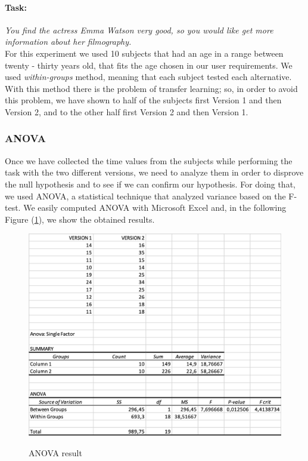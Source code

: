 \documentclass[12pt, a4paper]{article}
\numberwithin{figure}{section}
\begin{document}
\paragraph{Task:} \textit{You find the actress Emma Watson very good, so you would like
get more information about her filmography.}\\ 

\noindent 
For this experiment we used 10 subjects that had an age in a range between twenty - thirty years old, that 
fits the age chosen in our user requirements.
We used \textit{within-groups} method, meaning that each subject tested each alternative.
With this method there is the problem of transfer learning; so, in order to avoid this problem, 
we have shown to half of the subjects first Version 1 and then Version 2, and to the other 
half first Version 2 and then Version 1.

\subsubsection{ANOVA}

Once we have collected the time values from the subjects while performing the task with the two
different versions, we need to analyze them in order to disprove the null hypothesis and to see
if we can confirm our hypothesis.
For doing that, we used ANOVA, a statistical technique that analyzed variance based on the 
F-test. We easily computed ANOVA with Microsoft Excel and, in the following Figure (\ref{fig:anova}),
we show the obtained results.

\begin{center}
	\begin{figure}[H]
		\centering
		\includegraphics[width=1\textwidth]{images/anova.png}\\
		\caption{ANOVA result}
		\label{fig:anova}
	\end{figure}
\end{center}
\end{document}
